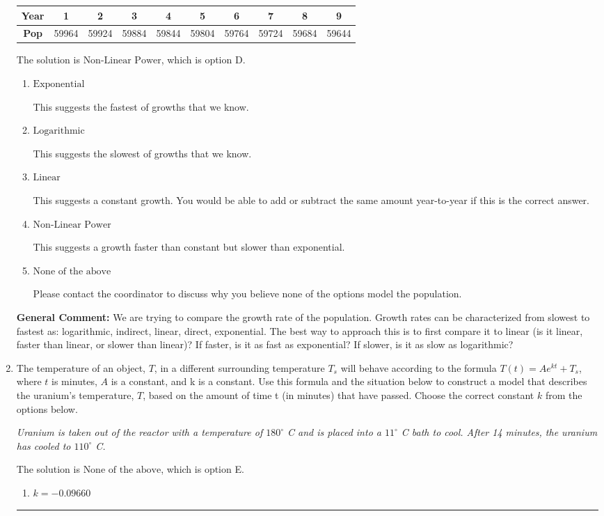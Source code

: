 \documentclass{extbook}[14pt]
\newcommand{\litem}[1]{\item #1

\rule{\textwidth}{0.4pt}}
\begin{document}
\begin{enumerate}
{\begin{tabular}{c|c|c|c|c|c|c|c|c|c}
\textbf{Year} &1 &2 &3 &4 &5 &6 &7 &8 &9\tabularnewline \hline
\textbf{Pop} &59964 &59924 &59884 &59844 &59804 &59764 &59724 &59684 &59644\end{tabular}The solution is \( \text{Non-Linear Power} \), which is option D.\begin{enumerate}[label=\Alph*.]
\item \( \text{Exponential} \)

This suggests the fastest of growths that we know.
\item \( \text{Logarithmic} \)

This suggests the slowest of growths that we know.
\item \( \text{Linear} \)

This suggests a constant growth. You would be able to add or subtract the same amount year-to-year if this is the correct answer.
\item \( \text{Non-Linear Power} \)

This suggests a growth faster than constant but slower than exponential.
\item \( \text{None of the above} \)

Please contact the coordinator to discuss why you believe none of the options model the population.
\end{enumerate}

\textbf{General Comment:} We are trying to compare the growth rate of the population. Growth rates can be characterized from slowest to fastest as: logarithmic, indirect, linear, direct, exponential. The best way to approach this is to first compare it to linear (is it linear, faster than linear, or slower than linear)? If faster, is it as fast as exponential? If slower, is it as slow as logarithmic?
}
\litem{
The temperature of an object, $T$, in a different surrounding temperature $T_s$ will behave according to the formula $T(t) = Ae^{kt} + T_s$, where $t$ is minutes, $A$ is a constant, and k is a constant. Use this formula and the situation below to construct a model that describes the uranium's temperature, $T$, based on the amount of time t (in minutes) that have passed. Choose the correct constant $k$ from the options below.

\begin{center}
    \textit{ Uranium is taken out of the reactor with a temperature of $180^{\circ}$ C and is placed into a $11^{\circ}$ C bath to cool. After 14 minutes, the uranium has cooled to $110^{\circ}$ C. }
\end{center}
The solution is \( \text{None of the above} \), which is option E.\begin{enumerate}[label=\Alph*.]
\item \( k = -0.09660 \)


\end{enumerate}}
\end{enumerate}
\end{document}

